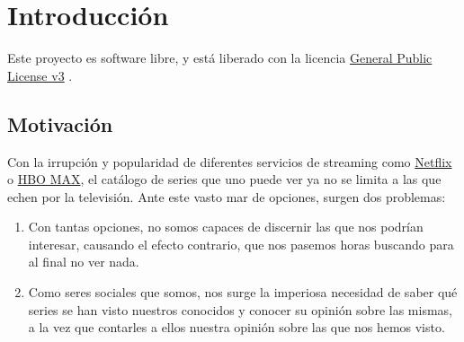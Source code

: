 \chapter{Introducción}

Este proyecto es software libre, y está liberado con la licencia \href{http://www.gnu.org/licenses/gpl.html}{General Public License v3} \cite{gplv3}.

\section{Motivación}
Con la irrupción y popularidad de diferentes servicios de streaming como \href{https://netflix.com}{Netflix} o \href{https://hbomax.com}{HBO MAX}, el catálogo de series que uno puede ver ya no se limita a las que echen por la televisión. Ante este vasto mar de opciones, surgen dos problemas:
\begin{enumerate}
    \item Con tantas opciones, no somos capaces de discernir las que nos podrían interesar, causando el efecto contrario, que nos pasemos horas buscando para al final no ver nada.
    \item Como seres sociales que somos, nos surge la imperiosa necesidad de saber qué series se han visto nuestros conocidos y conocer su opinión sobre las mismas, a la vez que contarles a ellos nuestra opinión sobre las que nos hemos visto.
\end{enumerate}

